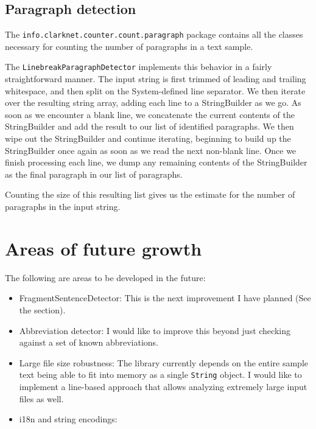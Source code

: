 \documentclass{article}
\begin{document}
\subsection{Paragraph detection}
The \texttt{info.clarknet.counter.count.paragraph} package contains all the classes necessary for counting the number of paragraphs in a text sample.

The \texttt{LinebreakParagraphDetector} implements this behavior in a fairly straightforward manner. The input string is first trimmed of leading and trailing whitespace, and then split on the System-defined line separator. We then iterate over the resulting string array, adding each line to a StringBuilder as we go. As soon as we encounter a blank line, we concatenate the current contents of the StringBuilder and add the result to our list of identified paragraphs. We then wipe out the StringBuilder and continue iterating, beginning to build up the StringBuilder once again as soon as we read the next non-blank line. Once we finish processing each line, we dump any remaining contents of the StringBuilder as the final paragraph in our list of paragraphs.

Counting the size of this resulting list gives us the estimate for the number of paragraphs in the input string.


\section{Areas of future growth}
The following are areas to be developed in the future:
\begin{itemize}
 \item FragmentSentenceDetector: This is the next improvement I have planned (See the  section).
 \item Abbreviation detector: I would like to improve this beyond just checking against a set of known abbreviations.
 \item Large file size robustness: The library currently depends on the entire sample text being able to fit into memory as a single \texttt{String} object. I would like to implement a line-based approach that allows analyzing extremely large input files as well.
 \item i18n and string encodings:
\end{itemize}
\end{document}
